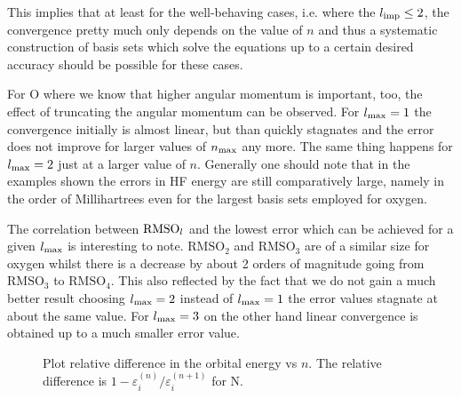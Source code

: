 \defineabbr{AM}{AM\xspace}{angular momentum}
This implies that at least for the well-behaving cases,
i.e. where the $l_\text{imp} \le 2$,
the convergence pretty much only depends on the value
of $n$ and thus a systematic construction of basis
sets which solve the \HF equations up to a certain
desired accuracy should be possible for these cases.

For O where we know that higher angular momentum is important, too,
the effect of truncating the angular momentum can be observed.
For $l_\text{max} = 1$ the convergence initially is almost linear,
but than quickly stagnates and the error does not improve for larger
values of $n_\text{max}$ any more. The same thing happens for
$l_\text{max} = 2$ just at a larger value of $n$.
Generally one should note that in the examples shown
the errors in HF energy are still comparatively large,
namely in the order of Millihartrees even for the largest
basis sets employed for oxygen.

The correlation between $\text{RMSO}_l$ and the lowest error which can be
achieved for a given $l_\text{max}$ is interesting to note.
$\text{RMSO}_2$ and $\text{RMSO}_3$ are of a similar size for oxygen
whilst there is a decrease by about 2 orders of magnitude going
from $\text{RMSO}_3$ to $\text{RMSO}_4$.
This also reflected by the fact that we do not gain a much better
result choosing $l_\text{max} = 2$ instead of $l_\text{max} = 1$
the error values stagnate at about the same value.
For $l_\text{max} = 3$ on the other hand linear convergence is obtained
up to a much smaller error value.


\begin{figure}
	\centering
	\caption{Plot relative difference in the orbital energy vs $n$.
		The relative difference is $1 - \varepsilon_i^{(n)} / \varepsilon_i^{(n+1)}$
		for N.
	}
	\label{fig:OrbenNlmN}
\end{figure}


